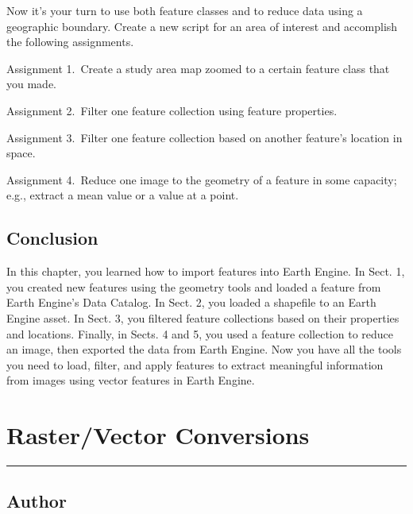 \documentclass[
  letterpaper,
  DIV=11,
  numbers=noendperiod]{scrreprt}
\begin{document}

Now it's your turn to use both feature classes and to reduce data using
a geographic boundary. Create a new script for an area of interest and
accomplish the following assignments.

Assignment 1.~Create a study area map zoomed to a certain feature class
that you made.

Assignment 2.~Filter one feature collection using feature properties.

Assignment 3.~Filter one feature collection based on another feature's
location in space.

Assignment 4.~Reduce one image to the geometry of a feature in some
capacity; e.g., extract a mean value or a value at a point.

\hypertarget{conclusion-17}{%
\section*{Conclusion}\label{conclusion-17}}


In this chapter, you learned how to import features into Earth Engine.
In Sect. 1, you created new features using the geometry tools and loaded
a feature from Earth Engine's Data Catalog. In Sect. 2, you loaded a
shapefile to an Earth Engine asset. In Sect. 3, you filtered feature
collections based on their properties and locations. Finally, in Sects.
4 and 5, you used a feature collection to reduce an image, then exported
the data from Earth Engine. Now you have all the tools you need to load,
filter, and apply features to extract meaningful information from images
using vector features in Earth Engine.

\hypertarget{rastervector-conversions}{%
\chapter{Raster/Vector Conversions}\label{rastervector-conversions}}

\begin{center}\rule{0.5\linewidth}{0.5pt}\end{center}

\hypertarget{author-16}{%
\section*{Author}\label{author-16}}
\end{document}
